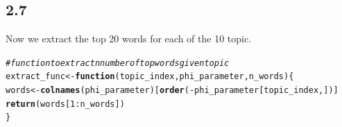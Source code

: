 \documentclass[10pt, a4paper, english]{article}\usepackage[]{graphicx}\usepackage[dvipsnames]{xcolor}
\makeatletter
\newcommand{\hlnum}[1]{\textcolor[rgb]{0.686,0.059,0.569}{#1}}%
\newcommand{\hlcom}[1]{\textcolor[rgb]{0.678,0.584,0.686}{\textit{#1}}}%
\newcommand{\hlopt}[1]{\textcolor[rgb]{0,0,0}{#1}}%
\newcommand{\hlstd}[1]{\textcolor[rgb]{0.345,0.345,0.345}{#1}}%
\newcommand{\hlkwa}[1]{\textcolor[rgb]{0.161,0.373,0.58}{\textbf{#1}}}%
\newcommand{\hlkwb}[1]{\textcolor[rgb]{0.69,0.353,0.396}{#1}}%
\newcommand{\hlkwc}[1]{\textcolor[rgb]{0.333,0.667,0.333}{#1}}%
\newcommand{\hlkwd}[1]{\textcolor[rgb]{0.737,0.353,0.396}{\textbf{#1}}}%
\newenvironment{kframe}{%
 \def\at@end@of@kframe{}%
 \ifinner\ifhmode%
  \def\at@end@of@kframe{\end{minipage}}%
  \begin{minipage}{\columnwidth}%
 \fi\fi%
 \def\FrameCommand##1{\hskip\@totalleftmargin \hskip-\fboxsep
 \colorbox{shadecolor}{##1}\hskip-\fboxsep
     \hskip-\linewidth \hskip-\@totalleftmargin \hskip\columnwidth}%
 \MakeFramed {\advance\hsize-\width
   \@totalleftmargin\z@ \linewidth\hsize
   \@setminipage}}%
 {\par\unskip\endMakeFramed%
 \at@end@of@kframe}
\newenvironment{knitrout}{}{} %
\makeatother
\begin{document}
\subsection{2.7}
Now we extract the top 20 words for each of the 10 topic.
\begin{knitrout}
\color{fgcolor}\begin{kframe}
\begin{alltt}
\hlcom{#function to extract n number of top words given topic}
\hlstd{extract_func} \hlkwb{<-} \hlkwa{function}\hlstd{(}\hlkwc{topic_index}\hlstd{,} \hlkwc{phi_parameter}\hlstd{,} \hlkwc{n_words}\hlstd{)\{}
  \hlstd{words} \hlkwb{<-} \hlkwd{colnames}\hlstd{(phi_parameter)[}\hlkwd{order}\hlstd{(}\hlopt{-}\hlstd{phi_parameter[topic_index,])]}
  \hlkwd{return}\hlstd{(words[}\hlnum{1}\hlopt{:}\hlstd{n_words])}
\hlstd{\}}


\end{alltt}
\end{kframe}
\end{knitrout}
\end{document}
